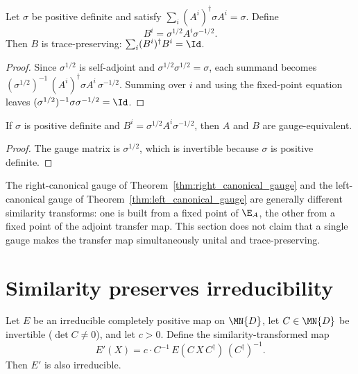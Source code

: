 \begin{theorem}%
    \label{thm:tp_gauge_from_adjoint_fixed}
    \leanok
    Let $\sigma$ be positive definite and satisfy
    $\sum_i (A^i)^\dagger \sigma A^i = \sigma$.
    Define
    \[
        B^i = \sigma^{1/2} A^i \sigma^{-1/2}.
    \]
    Then $B$ is trace-preserving:
    $\sum_i (B^i)^\dagger B^i = \Id$.
\end{theorem}

\begin{proof}\leanok
    Since $\sigma^{1/2}$ is self-adjoint and
    $\sigma^{1/2}\sigma^{1/2}=\sigma$, each summand becomes
    $(\sigma^{1/2})^{-1}\,(A^i)^\dagger\sigma A^i\,\sigma^{-1/2}$.
    Summing over $i$ and using the fixed-point equation leaves
    $(\sigma^{1/2})^{-1}\sigma\sigma^{-1/2}=\Id$.
\end{proof}

\begin{lemma}%
    \label{lem:tp_gauge_equiv}
    \leanok
    If $\sigma$ is positive definite and
    $B^i=\sigma^{1/2}A^i\sigma^{-1/2}$, then $A$ and $B$ are
    gauge-equivalent.
\end{lemma}

\begin{proof}\leanok
    The gauge matrix is $\sigma^{1/2}$, which is invertible because
    $\sigma$ is positive definite.
\end{proof}

\begin{remark}\leanok
    The right-canonical gauge of Theorem~\ref{thm:right_canonical_gauge}
    and the left-canonical gauge of Theorem~\ref{thm:left_canonical_gauge}
    are generally different similarity transforms: one is built from a fixed point
    of $\E_A$, the other from a fixed point of the adjoint transfer map.
    This section does not claim that a single gauge makes the transfer map
    simultaneously unital and trace-preserving.
\end{remark}

\section{Similarity preserves irreducibility}

\begin{lemma}%
    \label{lem:similarity_irred}
    \leanok
    Let $E$ be an irreducible completely positive map on $\MN{D}$,
    let $C \in \MN{D}$ be invertible ($\det C \neq 0$), and let
    $c > 0$.
    Define the similarity-transformed map
    \[
        E'(X) = c \cdot C^{-1}\, E\!(C\,X\,C^\dagger)\,(C^\dagger)^{-1}.
    \]
    Then $E'$ is also irreducible.
\end{lemma}

